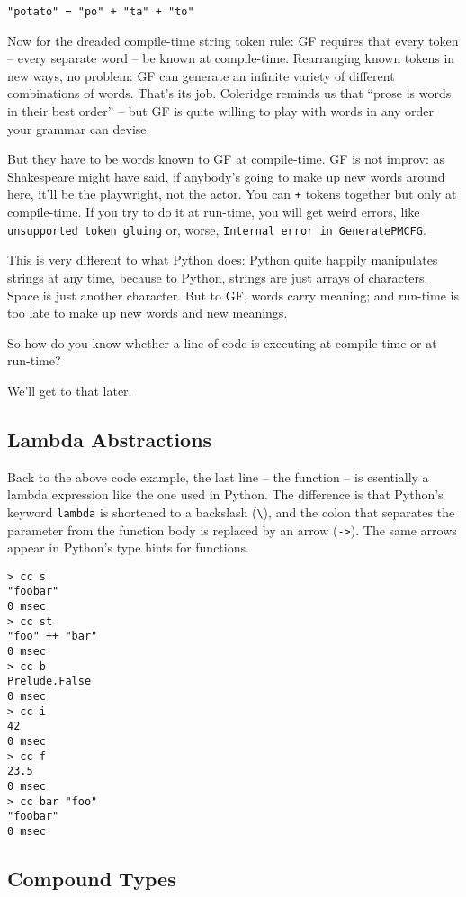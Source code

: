 \documentclass{scrartcl}
\begin{document}
\begin{verbatim}
"potato" = "po" + "ta" + "to"
\end{verbatim}

Now for the dreaded compile-time string token rule: GF requires that every token -- every separate word -- be known at compile-time. Rearranging known tokens in new ways, no problem: GF can generate an infinite variety of different combinations of words. That's its job. Coleridge reminds us that ``prose is words in their best order'' -- but GF is quite willing to play with words in any order your grammar can devise.

But they have to be words known to GF at compile-time. GF is not improv: as Shakespeare might have said, if anybody's going to make up new words around here, it'll be the playwright, not the actor. You can \texttt{+} tokens together but only at compile-time. If you try to do it at run-time, you will get weird errors, like \texttt{unsupported token gluing} or, worse, \texttt{Internal error in GeneratePMCFG}.

This is very different to what Python does: Python quite happily manipulates strings at any time, because to Python, strings are just arrays of characters. Space is just another character. But to GF, words carry meaning; and run-time is too late to make up new words and new meanings.

So how do you know whether a line of code is executing at compile-time or at run-time?

We'll get to that later.

\subsection{Lambda Abstractions}

Back to the above code example, the last line -- the function -- is esentially a lambda expression like the one used in Python. The difference is that Python's keyword \texttt{lambda} is shortened to a backslash (\texttt{\textbackslash}), and the colon that separates the parameter from the function body is replaced by an arrow (\texttt{->}). The same arrows appear in Python's type hints for functions.

\begin{verbatim}
> cc s
"foobar"
0 msec
> cc st
"foo" ++ "bar"
0 msec
> cc b
Prelude.False
0 msec
> cc i
42
0 msec
> cc f
23.5
0 msec
> cc bar "foo"
"foobar"
0 msec
\end{verbatim}

\subsection{Compound Types}
\end{document}
